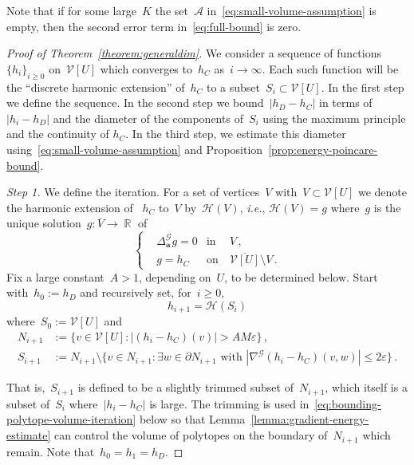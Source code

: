 \documentclass[12pt]{amsart}
\numberwithin{equation}{section}
\DeclareMathOperator{\R}{\mathbb{R}}
\newcommand{\ie}{{\it i.e.}}
\newcommand{\V}{\mathcal{V}}
\newcommand{\eps}{\varepsilon}
\newcommand{\aDelta}{\hyperref[eq:geometric-laplacian]{{\Delta^{\mathcal{G}}_{\cond}}}}
\newcommand{\cond}{\hyperref[eq:geometric-laplacian]{\mathbf{a}}}
\begin{document}
	Note that if for some large~$K$ the set~$\mathcal{A}$ in~\eqref{eq:small-volume-assumption} is empty, then the second error term 
	in~\eqref{eq:full-bound} is zero. 
\begin{proof}[Proof of Theorem~\ref{theorem:generaldim}]
	We consider a sequence of functions~$\{h_i\}_{i \geq 0}$ on~$\V[U]$ which converges to~$h_C$ as~$i \to \infty$. 
	Each such function will be the ``discrete harmonic extension'' of~$h_C$ to a subset~$S_i \subset \V[U]$.
	In the first step we define the sequence. In the second step we bound~$|h_D - h_C|$
	in terms of~$|h_i - h_D|$ and the diameter of the components of~$S_i$ using the maximum principle and the continuity of $h_C$.  In the third step, we estimate this diameter using~\eqref{eq:small-volume-assumption} and Proposition~\ref{prop:energy-poincare-bound}. 
	\smallskip




	\emph{Step 1.} We define the iteration. For a set of vertices~$V$ with~$V \subset \V[U]$ we denote the harmonic extension of 
	~$h_C$ to~$V$ by~$\mathcal{H}(V)$, \ie, $\mathcal{H}(V) = g$ where~$g$ is the unique solution~$g: \overline{V} \to \R$ of 
	\[
	\left\{
	\begin{aligned}
		&  \aDelta g = 0 & \mbox{in} & \ V \,,
		\\
		& g = h_C & \mbox{on} &  \ \overline{\V[U]} \setminus V  \, . 
	\end{aligned}
	\right.
	\]
	{Fix a large constant~$A > 1$, depending on~$U$, to be determined below. }
	Start with~$h_0 := h_D$ and recursively set, for~$i \geq 0$, 
	\[
	h_{i+1} = \mathcal{H}(S_i)
	\]
	where~$S_0 := \V[U]$ and
	\begin{equation}
		\label{eq:def-of-bad-set}
		\begin{aligned}
				N_{i+1} &:= \{ v \in \V[U] : |(h_{i} - h_C)(v)| > {A M \eps}    \}  \, ,  \\
			S_{i+1} &:=  N_{i+1}  \setminus \{ v \in N_{i+1} : \exists w \in \partial N_{i+1} \, \, \mbox{with} \, \, |\nabla^{\mathcal{G}}(h_i - h_C)(v,w)| \leq 2 \eps \}    \, .
		\end{aligned}
	\end{equation}

	 That is,~$S_{i+1}$ is defined to be a slightly trimmed subset of~$N_{i+1}$, which itself is a subset of~$S_i$ where~$|h_{i}-h_C|$ is large.
	 The trimming is used in~\eqref{eq:bounding-polytope-volume-iteration} below so that Lemma~\ref{lemma:gradient-energy-estimate} can control the volume of polytopes on the boundary of~$N_{i+1}$ which remain. Note that~$h_0 = h_1 = h_D$. 
	\smallskip
	

\end{proof}
\end{document}
